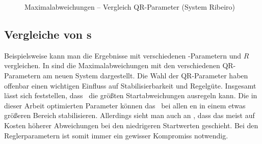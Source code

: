 \begin{figure}[htbp]
	\caption{Maximalabweichungen -- Vergleich QR-Parameter (System Ribeiro)}
	\label{fig:qrvglrib}
\end{figure}

\subsection{Vergleiche von \xots s}\label{subsec:xotsvgl}

Beispielsweise kann man die Ergebnisse mit verschiedenen \ricc-Parametern  und $R$ vergleichen.
In  sind die Maximalabweichungen mit den verschiedenen QR-Parametern  am neuen System dargestellt.
Die Wahl der QR-Parameter haben offenbar einen wichtigen Einfluss auf Stabilisierbarkeit und Regelgüte.
Insgesamt lässt sich feststellen, dass \apd\ die größten Startabweichungen ausregeln kann.
Die in dieser Arbeit optimierten Parameter können das \dpd\ bei allen \ap en in einem etwas größeren Bereich stabilisieren.
Allerdings sieht man auch \zB an \apve, dass das meist auf Kosten höherer Abweichungen bei den niedrigeren Startwerten geschieht.
Bei den Reglerparametern ist somit immer ein gewisser Kompromiss notwendig.


